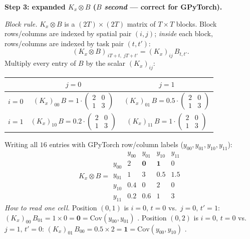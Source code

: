 \documentclass[11pt]{article}
\theoremstyle{plain}
\begin{document}
\medskip
\textbf{Step 3: expanded $K_x \otimes B$ ($B$ \emph{second} --- correct for GPyTorch).}

\smallskip\noindent
\textit{Block rule.} $K_x \otimes B$ is a $(2T)\times(2T)$ matrix of $T\times T$ blocks.
Block rows/columns are indexed by spatial pair $(i,j)$; \emph{inside} each block, rows/columns are
indexed by task pair $(t,t')$:
\begin{equation*}
  \boxed{
    (K_x \otimes B)_{\,iT+t,\; jT+t'}
    = (K_x)_{ij}\, B_{t,t'}.
  }
\end{equation*}
Multiply every entry of $B$ by the scalar $(K_x)_{ij}$:
\begin{center}
\renewcommand{\arraystretch}{1.2}
\begin{tabular}{@{}c|c|c@{}}
  & $j=0$ & $j=1$ \\
\midrule
$i=0$
& $(K_x)_{00}\,B = 1 \cdot \begin{pmatrix}2&0\\1&3\end{pmatrix}$
& $(K_x)_{01}\,B = 0.5 \cdot \begin{pmatrix}2&0\\1&3\end{pmatrix}$ \\[8pt]
$i=1$
& $(K_x)_{10}\,B = 0.2 \cdot \begin{pmatrix}2&0\\1&3\end{pmatrix}$
& $(K_x)_{11}\,B = 1 \cdot \begin{pmatrix}2&0\\1&3\end{pmatrix}$ \\
\end{tabular}
\end{center}
Writing all $16$ entries with GPyTorch row/column labels ($y_{00}, y_{01}, y_{10}, y_{11}$):
\begin{equation*}
  K_x \otimes B
  = \begin{array}{c|cccc}
      & y_{00} & y_{01} & y_{10} & y_{11} \\ \hline
    y_{00} & 2   & \mathbf{0} & \mathbf{1} & 0 \\
    y_{01} & 1   & 3   & 0.5 & 1.5 \\
    y_{10} & 0.4 & 0   & 2   & 0 \\
    y_{11} & 0.2 & 0.6 & 1   & 3
    \end{array}
\end{equation*}
\emph{How to read one cell.} Position $(0,1)$ is $i{=}0,\,t{=}0$ vs.\ $j{=}0,\,t'{=}1$:
$(K_x)_{00}\,B_{01} = 1 \times 0 = \mathbf{0} = \mathrm{Cov}(y_{00},y_{01})$ \checkmark.
Position $(0,2)$ is $i{=}0,\,t{=}0$ vs.\ $j{=}1,\,t'{=}0$:
$(K_x)_{01}\,B_{00} = 0.5 \times 2 = \mathbf{1} = \mathrm{Cov}(y_{00},y_{10})$ \checkmark.
\end{document}
